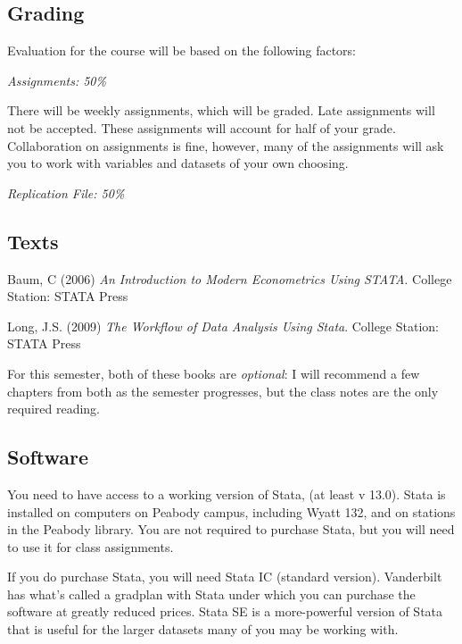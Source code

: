 \documentclass[12pt]{article}
\begin{document}
\subsection{Grading}%
\begin{flushleft}
Evaluation for the course will be based on the following factors:

\textit{Assignments: 50\%}

There will be weekly assignments, which will be graded. Late assignments will not be accepted. These assignments
will account for half of your grade. Collaboration on assignments is
fine, however, many of the assignments will ask you to work with
variables and datasets of your own choosing.

\textit{Replication File: 50\%}


\end{flushleft}

\subsection{Texts}%

\begin{flushleft}

Baum, C (2006) \textit{An Introduction to Modern Econometrics Using
STATA}. College Station: STATA Press

Long, J.S. (2009) \textit{The Workflow of Data Analysis Using Stata}. College Station: STATA Press

For this semester, both of these books are \textit{optional}: I will
recommend a few chapters from both as the semester progresses, but the
class notes are the only required reading. 

\end{flushleft}

\subsection{Software}

You need to have access to a working version of Stata, (at least v
13.0).  Stata is installed on computers on Peabody campus, including
Wyatt 132, and on stations in the Peabody library. You are not
required to purchase Stata, but you will need to use it for class
assignments.

If you do purchase Stata, you will need Stata IC (standard
version). Vanderbilt has what's called a gradplan with Stata under
which you can purchase the software at greatly reduced prices.  Stata
SE is a more-powerful version of Stata that is useful for the larger
datasets many of you may be working with.
\end{document}
